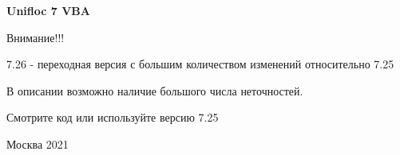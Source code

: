 \thispagestyle{empty}
\begin{center}

\end{center}
%
\vspace{0pt plus4fill} %
%
\vspace{0pt plus6fill} %
\begin{center}
{\large \thesisTitle}
\end{center}
%
\vspace{0pt plus1fill} %
\begin{center}
\textbf {\large %
Unifloc 7 VBA}

\vspace{0pt plus2fill} %
{%

}

\vspace{0pt plus2fill} %
\unf


\end{center}
%
\vspace{0pt plus4fill} %
\begin{flushright}
Внимание!!!

7.26 - переходная версия с большим количеством изменений относительно 7.25

В описании возможно наличие большого числа неточностей. 

Смотрите код или используйте версию 7.25

\end{flushright}
%
\vspace{0pt plus4fill} %
{\centering Москва 2021\par}

